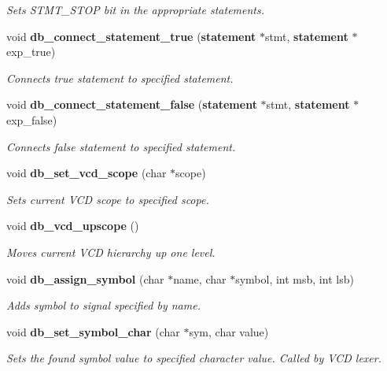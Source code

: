 \begin{CompactItemize}
\begin{CompactList}\small\item\em Sets STMT\_\-STOP bit in the appropriate statements. \item\end{CompactList}\item 
void {\bf db\_\-connect\_\-statement\_\-true} ({\bf statement} $\ast$stmt, {\bf statement} $\ast$exp\_\-true)
\begin{CompactList}\small\item\em Connects true statement to specified statement. \item\end{CompactList}\item 
void {\bf db\_\-connect\_\-statement\_\-false} ({\bf statement} $\ast$stmt, {\bf statement} $\ast$exp\_\-false)
\begin{CompactList}\small\item\em Connects false statement to specified statement. \item\end{CompactList}\item 
void {\bf db\_\-set\_\-vcd\_\-scope} (char $\ast$scope)
\begin{CompactList}\small\item\em Sets current VCD scope to specified scope. \item\end{CompactList}\item 
void {\bf db\_\-vcd\_\-upscope} ()
\begin{CompactList}\small\item\em Moves current VCD hierarchy up one level. \item\end{CompactList}\item 
void {\bf db\_\-assign\_\-symbol} (char $\ast$name, char $\ast$symbol, int msb, int lsb)
\begin{CompactList}\small\item\em Adds symbol to signal specified by name. \item\end{CompactList}\item 
void {\bf db\_\-set\_\-symbol\_\-char} (char $\ast$sym, char value)
\begin{CompactList}\small\item\em Sets the found symbol value to specified character value. Called by VCD lexer. \item\end{CompactList}\item 

\end{CompactItemize}
